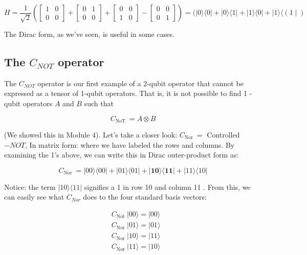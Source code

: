 \documentclass[main.tex]{subfiles}
\begin{document}
    $$
    H=\frac{1}{\sqrt{2}}\left(\left[\begin{array}{ll}
    1 & 0 \\
    0 & 0
    \end{array}\right]+\left[\begin{array}{ll}
    0 & 1 \\
    0 & 0
    \end{array}\right]+\left[\begin{array}{ll}
    0 & 0 \\
    1 & 0
    \end{array}\right]-\left[\begin{array}{ll}
    0 & 0 \\
    0 & 1
    \end{array}\right]\right)=(|0\rangle\langle 0|+| 0\rangle\langle 1|+| 1\rangle\langle 0|+| 1\rangle\langle(1 \mid)
    $$
    
    The Dirac form, as we've seen, is useful in some cases.

\subsection{The $C_{NOT}$ operator}

    The $C_{N O T}$ operator is our first example of a 2-qubit operator that cannot be expressed as a tensor of 1-qubit operators. That is, it is not possible to find 1 -qubit operators $A$ and $B$ such that
    
    $$
    C_{\text {NoT }}=A \otimes B
    $$
    
    (We showed this in Module 4). Let's take a closer look: $C_{\text {Nor }}=$ Controlled $-N O T$, In matrix form: where we have labeled the rows and columns. By examining the 1's above, we can write this in Dirac outer-product form as:
    
    $$
    C_{\text {Nor }}=|00\rangle\langle 00|+| 01\rangle\langle 01|+| \mathbf{1 0}\rangle\langle\mathbf{1 1}|+| 11\rangle\langle 10|
    $$
    
    Notice: the term $|10\rangle\langle 11|$ signifies a 1 in row 10 and column 11 . From this, we can easily see what $C_{N o r}$ does to the four standard basis vectors:
    
    $$
    \begin{aligned}
    &C_{\text {Not }}|00\rangle=|00\rangle \\
    &C_{\text {Nor }}|01\rangle=|01\rangle \\
    &C_{\text {Nor }}|10\rangle=|11\rangle \\
    &C_{\text {Nor }}|11\rangle=|10\rangle
    \end{aligned}
    $$
    
\end{document}
